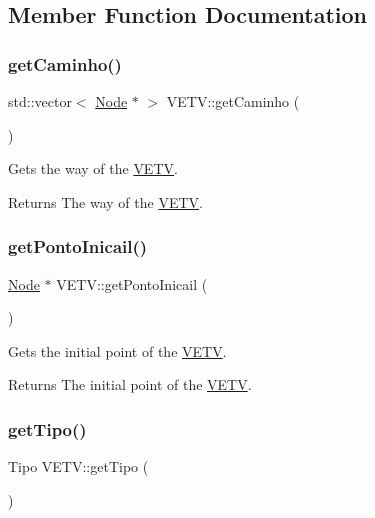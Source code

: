 \subsection{Member Function Documentation}
\mbox{\label{class_v_e_t_v_a4a76c35f8b84ec8ad9ac270de1d58e97}} 
\subsubsection{\texorpdfstring{getCaminho()}{getCaminho()}}
{\footnotesize\ttfamily std\+::vector$<$ \mbox{\hyperlink{class_node}{Node}} $\ast$ $>$ V\+E\+T\+V\+::get\+Caminho (\begin{DoxyParamCaption}{ }\end{DoxyParamCaption})}



Gets the way of the \mbox{\hyperlink{class_v_e_t_v}{V\+E\+TV}}. 

\begin{DoxyReturn}{Returns}
The way of the \mbox{\hyperlink{class_v_e_t_v}{V\+E\+TV}}. 
\end{DoxyReturn}
\mbox{\label{class_v_e_t_v_a3340f7ffe712a82464823f39a49814da}} 
\subsubsection{\texorpdfstring{getPontoInicail()}{getPontoInicail()}}
{\footnotesize\ttfamily \mbox{\hyperlink{class_node}{Node}} $\ast$ V\+E\+T\+V\+::get\+Ponto\+Inicail (\begin{DoxyParamCaption}{ }\end{DoxyParamCaption})}



Gets the initial point of the \mbox{\hyperlink{class_v_e_t_v}{V\+E\+TV}}. 

\begin{DoxyReturn}{Returns}
The initial point of the \mbox{\hyperlink{class_v_e_t_v}{V\+E\+TV}}. 
\end{DoxyReturn}
\mbox{\label{class_v_e_t_v_a98c67beffd973984edc14a9a6c3fe858}} 
\subsubsection{\texorpdfstring{getTipo()}{getTipo()}}
{\footnotesize\ttfamily Tipo V\+E\+T\+V\+::get\+Tipo (\begin{DoxyParamCaption}{ }\end{DoxyParamCaption})}



